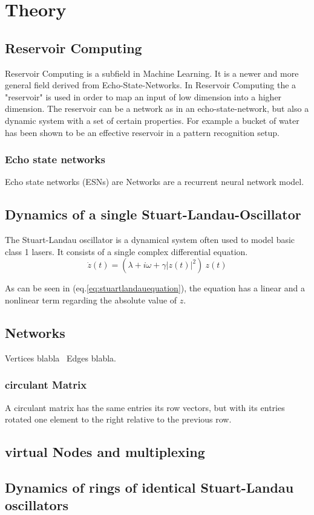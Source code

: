 \section{Theory}

	\subsection{Reservoir Computing}
	
	Reservoir Computing is a subfield in Machine Learning. It is a newer and more general field derived from Echo-State-Networks. In Reservoir Computing the a "reservoir" is used in order to map an input of low dimension into a higher dimension. The reservoir can be a network as in an echo-state-network, but also a dynamic system with a set of certain properties. For example a bucket of water has been shown to be an effective reservoir in a pattern recognition setup.
	
	\subsubsection{Echo state networks}
	Echo state networks (ESNs) are Networks are a recurrent neural network model. 
	

	\subsection{Dynamics of a single Stuart-Landau-Oscillator}
	The Stuart-Landau oscillator is a dynamical system often used to model basic class 1 lasers. It consists of a single complex differential equation. 
	\begin{equation}	
		\dot{z}(t) = (\lambda +  i \omega + \gamma |z(t)|^2 ) \ z(t)
		\label{eq:stuartlandauequation}		
	\end{equation}

As can be seen in (eq.\ref{eq:stuartlandauequation}), the equation has a linear and a nonlinear term regarding the absolute value of $z$.


\subsection{Networks}

Vertices blabla \
Edges blabla. \

	\subsubsection{circulant Matrix}
    A circulant matrix has the same entries its row vectors, but with its entries rotated one element to the right relative to the previous row.
    
   
    
\subsection{virtual Nodes and multiplexing}
	
	
\subsection{Dynamics of rings of identical Stuart-Landau oscillators}

